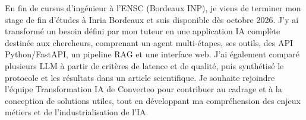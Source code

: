 
\begin{cvparagraph}
En fin de cursus d’ingénieur à l’ENSC (Bordeaux INP), je viens de terminer mon stage de fin d’études à Inria Bordeaux et suis disponible dès octobre 2026. J’y ai transformé un besoin défini par mon tuteur en une application IA complète destinée aux chercheurs, comprenant un agent multi-étapes, ses outils, des API Python/FastAPI, un pipeline RAG et une interface web. J’ai également comparé plusieurs LLM à partir de critères de latence et de qualité, puis synthétisé le protocole et les résultats dans un article scientifique. Je souhaite rejoindre l’équipe Transformation IA de Converteo pour contribuer au cadrage et à la conception de solutions utiles, tout en développant ma compréhension des enjeux métiers et de l’industrialisation de l’IA.
\end{cvparagraph}
